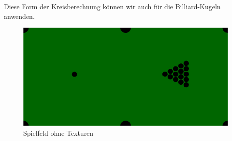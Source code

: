 	Diese Form der Kreisberechnung können wir auch für die Billiard-Kugeln anwenden.
	\begin{figure}[h]
		\caption{Spielfeld ohne Texturen}
			\includegraphics[width=\textwidth]{bilder/untextured_pool_low.png} 
	\end{figure}

